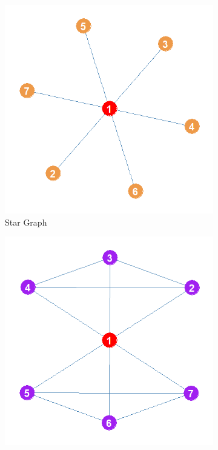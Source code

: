 \documentclass[12pt]{article}
\begin{document}
\begin{figure}
    \captionsetup[subfigure]{font=footnotesize,labelfont=footnotesize}
    \centering
     \begin{subfigure}[b]{0.35\textwidth}
        \includegraphics[width=1.0\textwidth]{Plots/star.png}
            \caption{Star Graph}
            \label{fig:star}
    \end{subfigure}
     \begin{subfigure}[b]{0.35\textwidth}
        \includegraphics[width=1.0\textwidth]{Plots/sf.png}

\end{subfigure}
\end{figure}
\end{document}
